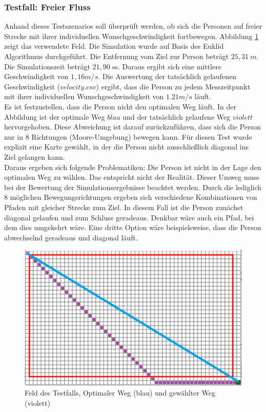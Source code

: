 \subsubsection{Testfall: Freier Fluss}
Anhand dieses Testszenarios soll überprüft werden, ob sich die Personen auf freier Strecke mit ihrer individuellen Wunschgeschwindigkeit fortbewegen. Abbildung \ref{fig:freeflowVGLmap} zeigt das verwendete Feld. Die Simulation wurde auf Basis des Euklid Algorithmus durchgeführt. Die Entfernung vom Ziel zur Person beträgt $25,31\ m$. Die Simulationszeit beträgt $21,90\ s$s. Daraus ergibt sich eine mittlere Geschwindigkeit von $1,16 m/s$. Die Auswertung der tatsächlich gelaufenen Geschwindigkeit ($velocity.csv$) ergibt, dass die Person zu jedem Messzeitpunkt mit ihrer individuellen Wunschgeschwindigkeit von $1.21 m/s$ läuft. \\
Es ist festzustellen, dass die Person nicht den optimalen Weg läuft. In der Abbildung ist der optimale Weg $blau$ und der tatsächlich gelaufene Weg $violett$ hervorgehoben. Diese Abweichung ist darauf zurückzuführen, dass sich die Person nur in 8 Richtungen (Moore-Umgebung) bewegen kann. Für diesen Test wurde explizit eine Karte gewählt, in der die Person nicht ausschließlich diagonal ins Ziel gelangen kann. \\
Daraus ergeben sich folgende Problematiken: Die Person ist nicht in der Lage den optimalen Weg zu wählen. Das entspricht nicht der Realität. Dieser Umweg muss bei der Bewertung der Simulationsergebnisse beachtet werden. Durch die lediglich 8 möglichen Bewegungsrichtungen ergeben sich verschiedene Kombinationen von Pfaden mit gleicher Strecke zum Ziel. In diesem Fall ist die Person zunächst diagonal gelaufen und zum Schluss geradeaus. Denkbar wäre auch ein Pfad, bei dem dies umgekehrt wäre. Eine dritte Option wäre beispielsweise, dass die Person abwechselnd geradeaus und diagonal läuft.

\begin{figure}[ht]
	\centering
	\includegraphics[width=\textwidth]{abbildungen/freeflowVGL.png}
	\caption{Feld des Testfalls, Optimaler Weg (blau) und gewählter Weg (violett)}
	\label{fig:freeflowVGLmap}
\end{figure}